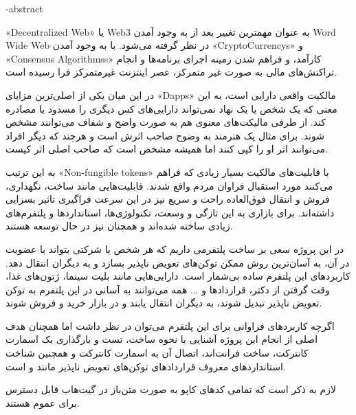 



\fa-abstract{ %
«\gls{Decentralized Web}»
یا
Web3
 به عنوان مهمترین تغییر بعد از به وجود آمدن
\gls{Word Wide Web}
 در نظر گرفته می‌شود. با به وجود آمدن
«\glspl{CryptoCurrency}»
و
«\glspl{Consensus Algorithms}»
کارآمد، و فراهم شدن زمینه اجرای برنامه‌ها و انجام تراکنش‌های مالی به صورت غیر متمرکز، عصر اینتزنت غیرمتمرکز فرا رسیده است.

در این میان یکی از اصلی‌ترین مزایای 
«\glspl{Dapp}»
مالکیت واقعی دارایی است، به این معنی که یک شخص یا یک نهاد نمی‌تواند دارایی‌های کس دیگری را مسدود یا مصادره کند. از طرفی مالیکت‌های معنوی هم به صورت واضح و شفاف می‌توانند مشخص شوند. برای مثال یک هنرمند به وضوح صاحب اثرش است و هرچند که دیگر افراد می‌توانند اثر او را کپی کنند اما همیشه مشخص است که صاحب اصلی اثر کیست.

به این ترتیب 
«\glspl{Non-fungible token}»
 با قابلیت‌های مالکیت بسیار زیادی که فراهم می‌کنند مورد استقبال فراوان مردم واقع شدند. قابلیت‌هایی مانند ساخت، نگهداری، فروش و انتقال فوق‌العاده راحت و سریع نیز در این سرعت فراگیری تاثیر بسزایی داشته‌اند. برای بازاری به این تازگی و وسعت، تکنولوژی‌ها، استاندارد‌ها و پلتفرم‌های زیادی ساخته شده‌اند و همچنان نیز در حال توسعه هستند.

در این پروژه سعی بر ساخت پلتفرمی داریم که هر شخص یا شرکتی بتواند با عضویت در آن، به آسان‌ترین روش ممکن توکن‌های تعویض ناپذیر‌ بسازد و به دیگران انتقال دهد. کاربرد‌های این پلتفرم ساده بی‌شمار است. دارایی‌هایی مانند بلیت سینما، ژتون‌های غذا، وقت گرفتن از دکتر، قراردادها و ... همه می‌توانند به آسانی در این پلتفرم به توکن تعویض ناپذیر تبدیل شوند، به دیگران انتقال یابند و در بازار خرید و فروش شوند.

اگرچه کاربردهای فراوانی برای این پلتفرم می‌توان در نظر داشت اما همچنان هدف اصلی از انجام این پروژه آشنایی با نحوه ساخت، تست و بارگذاری یک اسمارت کانترکت، ساخت فرانت‌اند، اتصال آن به اسمارت کانترکت و همچنین شناخت استاندارد‌های معروف قرارداد‌های توکن‌های تعویض ناپذیر مانند
و
 است.

لازم به ذکر است که تمامی کدهای کاپو به صورت متن‌باز در 
گیت‌هاب
قابل دسترس برای عموم هستند.
}
